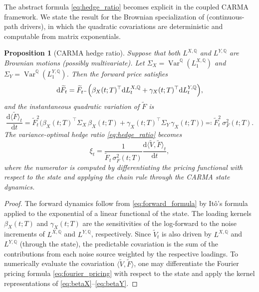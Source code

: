 \documentclass[10pt,a4paper,reqno]{amsart}
\newtheorem{proposition}[theorem]{Proposition}
\newcommand{\Q}{\mathbb{Q}}
\newcommand{\1}{\mathbbm{1}}
\newcommand{\dd}{\mathrm{d}}
\DeclareMathOperator{\Var}{Var}
\begin{document}
The abstract formula \eqref{eq:hedge_ratio} becomes explicit in the coupled
CARMA framework. We state the result for the Brownian specialization of
 (continuous-path drivers), in which the
quadratic covariations are deterministic and computable from matrix
exponentials.

\begin{proposition}[CARMA hedge ratio]
\label{prop:carma_hedge_ratio}
Suppose that both \(L^{X,\Q}\) and \(L^{Y,\Q}\) are Brownian motions (possibly
multivariate). Let \(\Sigma_X = \Var^\Q(L_1^{X,\Q})\) and
\(\Sigma_Y = \Var^\Q(L_1^{Y,\Q})\). Then the forward price satisfies
\[
\dd \widetilde{F}_t
= \widetilde{F}_{t^-}\Bigl(
    \beta_X(t;T)^\top \dd L_t^{X,\Q}
    + \gamma_X(t;T)^\top \dd L_t^{Y,\Q}
  \Bigr),
\]
and the instantaneous quadratic variation of \(\widetilde{F}\) is
\begin{equation}\label{eq:forward_qv}
  \frac{\dd \langle \widetilde{F} \rangle_t}{\dd t}
  = \widetilde{F}_t^2 \bigl(
      \beta_X(t;T)^\top \Sigma_X\, \beta_X(t;T)
      + \gamma_X(t;T)^\top \Sigma_Y\, \gamma_X(t;T)
    \bigr) \eqqcolon \widetilde{F}_t^2\, \sigma_F^2(t;T).
\end{equation}
The variance-optimal hedge ratio \eqref{eq:hedge_ratio} becomes
\begin{equation}\label{eq:hedge_ratio_carma}
  \xi_t
  = \frac{1}{\widetilde{F}_t\, \sigma_F^2(t;T)}
    \frac{\dd \langle \widetilde{V}, \widetilde{F} \rangle_t}{\dd t},
\end{equation}
where the numerator is computed by differentiating the pricing functional with
respect to the state and applying the chain rule through the CARMA state
dynamics.
\end{proposition}

\begin{proof}
The forward dynamics follow from \eqref{eq:forward_formula} by It\^o's formula
applied to the exponential of a linear functional of the state. The loading
kernels \(\beta_X(t;T)\) and \(\gamma_X(t;T)\) are the sensitivities of the
log-forward to the noise increments of \(L^{X,\Q}\) and
\(L^{Y,\Q}\), respectively. Since \(\widetilde{V}_t\) is also driven by
\(L^{X,\Q}\) and \(L^{Y,\Q}\) (through the state), the predictable covariation
is the sum of the contributions from each noise source weighted by the
respective loadings. To numerically evaluate the covariation
\(\langle\widetilde{V},\widetilde{F}\rangle\), one may differentiate the Fourier
pricing formula \eqref{eq:fourier_pricing} with respect to the state and apply
the kernel representations of \eqref{eq:betaX}--\eqref{eq:betaY}.
\end{proof}
\end{document}
